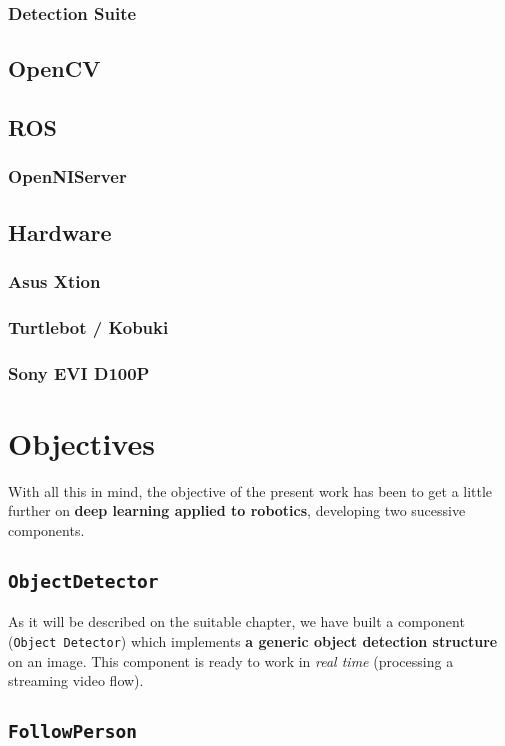 \subsection{Detection Suite}
\section{OpenCV}
\section{ROS}
\subsection{OpenNIServer}
\section{Hardware}
\subsection{Asus Xtion}
\subsection{Turtlebot / Kobuki}
\subsection{Sony EVI D100P}




\chapter{Objectives}


With all this in mind, the objective of the present work has been to get a little further on \textbf{deep learning applied to robotics}, developing two sucessive components.
\section{\texttt{ObjectDetector}}
As it will be described on the suitable chapter, we have built a component (\texttt{Object Detector}) which implements \textbf{a generic object detection structure} on an image. This component is ready to work in \emph{real time} (processing a streaming video flow).\\

\section{\texttt{FollowPerson}}

